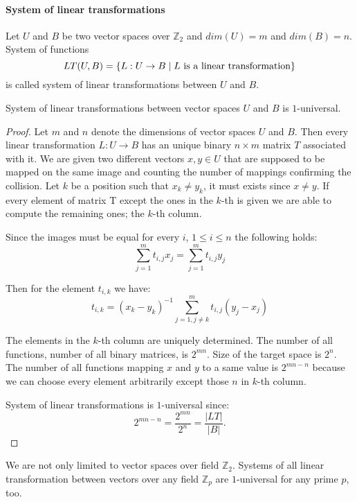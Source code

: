 \paragraph{System of linear transformations}
\begin{definition}
\label{definition-system-of-linear-transformations}
Let $U$ and $B$ be two vector spaces over $\mathbb{Z}_2$ and $dim(U) = m$ and $dim(B) = n$. System of functions \[ LT(U, B) = \{L : U \rightarrow B \mid L \text{ is a linear transformation}\} \] is called system of linear transformations between $U$ and $B$.
\end{definition}
\begin{remark}
\label{remark-system-of-linear-transformations}
System of linear transformations between vector spaces $U$ and $B$ is $1$-universal.
\end{remark}
\begin{proof}
Let $m$ and $n$ denote the dimensions of vector spaces $U$ and $B$. Then every linear transformation $L: U \rightarrow B$ has an unique binary $n \times m$ matrix $T$ associated with it. We are given two different vectors $x, y \in U$ that are supposed to be mapped on the same image and counting the number of mappings confirming the collision. Let $k$ be a position such that $x_k \neq y_k$, it must exists since $x \neq y$. If every element of matrix T except the ones in the $k$-th is given we are able to compute the remaining ones; the $k$-th column. 

Since the images must be equal for every $i$, $1 \leq i \leq n$ the following holds:
\[
\displaystyle\sum_{j = 1}^{m}t_{i, j}x_j = \displaystyle\sum_{j = 1}^{m}t_{i, j}y_j
\]

Then for the element $t_{i, k}$ we have:
\[
t_{i, k} = (x_k - y_k)^{-1}\displaystyle\sum_{j = 1, j \neq k}^{m}t_{i, j}(y_j - x_j)
\]

The elements in the $k$-th column are uniquely determined. The number of all functions, number of all binary matrices, is $2^{mn}$. Size of the target space is $2^n$. The number of all functions mapping $x$ and $y$ to a same value is $2^{mn - n}$ because we can choose every element arbitrarily except those $n$ in $k$-th column. 

System of linear transformations is $1$-universal since:
\[
2^{mn - n} = \frac{2^{mn}}{2^n} = \frac{|LT|}{|B|} \textit{.}
\]
\end{proof}

We are not only limited to vector spaces over field $\mathbb{Z}_2$. Systems of all linear transformation between vectors over any field $\mathbb{Z}_p$ are $1$-universal for any prime $p$, too.

